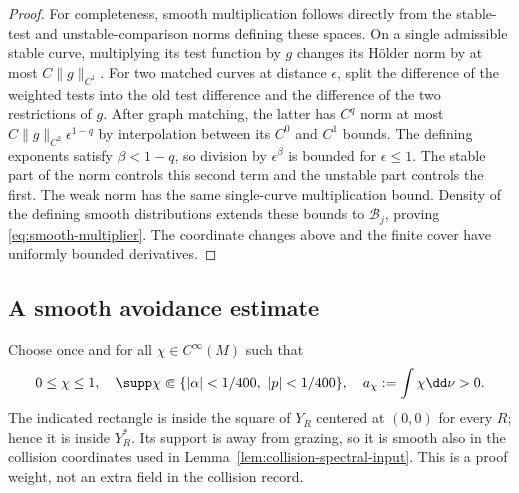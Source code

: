 \begin{proof}
For completeness, smooth multiplication follows directly from the
stable-test and unstable-comparison norms defining these spaces. On a
single admissible stable curve, multiplying its test function by $g$
changes its H\"older norm by at most $C\|g\|_{C^1}$. For two matched
curves at distance $\epsilon$, split the difference of the weighted tests
into the old test difference and the difference of the two restrictions
of $g$. After graph matching, the latter has $C^q$ norm at most
$C\|g\|_{C^2}\epsilon^{1-q}$ by interpolation between its $C^0$ and
$C^1$ bounds. The defining exponents satisfy $\beta<1-q$, so division
by $\epsilon^\beta$ is bounded for $\epsilon\le1$. The stable part of the
norm controls this second term and the unstable part controls the first.
The weak norm has the same single-curve multiplication bound. Density of
the defining smooth distributions extends these bounds to
$\mathcal B_j$, proving \eqref{eq:smooth-multiplier}. The coordinate
changes above and the finite cover have uniformly bounded derivatives.
\end{proof}
\subsection{A smooth avoidance estimate}
Choose once and for all $\chi\in C^\infty(M)$ such that
\begin{equation}\label{eq:fixed-killing-weight}
 0\le\chi\le1,\quad
 \supp\chi\Subset\{ |\alpha|<1/400,\ |p|<1/400\},\quad
 a_\chi:=\int\chi\dd\nu>0.
\end{equation}
The indicated rectangle is inside the square of $Y_R$ centered at
$(0,0)$ for every $R$; hence it is inside $Y_R^*$. Its support is away
from grazing, so it is smooth also in the collision coordinates used in
Lemma~\ref{lem:collision-spectral-input}. This is a proof weight, not an
extra field in the collision record.

